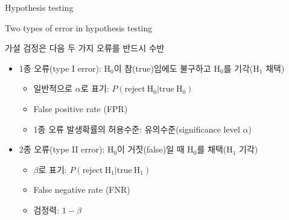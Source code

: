 \documentclass[9pt,ignorenonframetext,xcolor=dvipsnames]{beamer}
\providecommand{\tightlist}{%
  \setlength{\itemsep}{0pt}\setlength{\parskip}{0pt}}
\newlength{\wideitemsep}
\let\olditem\item
\renewcommand{\item}{\setlength{\itemsep}{\wideitemsep}\olditem}
\begin{document}
\begin{frame}{Hypothesis testing}

\begin{block}{Two types of error in hypothesis testing}

가설 검정은 다음 두 가지 오류를 반드시 수반

\begin{itemize}
\tightlist
\item
  1종 오류(type I error): \(\mathrm{H}_{0}\)이 참(true)임에도 불구하고
  \(\mathrm{H}_{0}\)를 기각(\(\mathrm{H}_{1}\) 채택)

  \begin{itemize}
  \tightlist
  \item
    일반적으로 \(\alpha\)로 표기:
    \(P(\mathrm{reject~H_{0}} | \mathrm{true ~ H_{0}})\)
  \item
    False positive rate (FPR)
  \item
    1종 오류 발생확률의 허용수준: 유의수준(significance level
    \(\alpha\))
  \end{itemize}
\item
  2종 오류(type II error): \(\mathrm{H}_{0}\)이 거짓(false)일 때
  \(\mathrm{H}_{0}\)를 채택(\(\mathrm{H}_{1}\) 기각)

  \begin{itemize}
  \tightlist
  \item
    \(\beta\)로 표기:
    \(P(\mathrm{reject~H_{1}} | \mathrm{true ~ H_{1}})\)
  \item
    False negative rate (FNR)
  \item
    검정력: \(1-\beta\)
  \end{itemize}
\end{itemize}

\end{block}

\end{frame}
\end{document}
